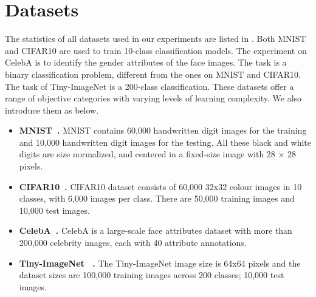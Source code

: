 \section{Datasets} \label{datasets_appendix}


The statistics of all datasets used in our experiments are listed in . Both MNIST and CIFAR10 are used to train 10-class classification models. The experiment on CelebA is to identify the gender attributes of the face images. The task is a binary classification problem, different from the ones on MNIST and CIFAR10. The task of Tiny-ImageNet is a 200-class classification. These datasets offer a range of objective categories with varying levels of learning complexity. We also introduce them as below.



\begin{itemize}[itemsep=0pt, parsep=0pt, leftmargin=*]
	\item \textbf{MNIST~\citep{deng2012mnist}.} MNIST contains 60,000 handwritten digit images for the training and 10,000 handwritten digit images for the testing. All these black and white digits are size normalized, and centered in a fixed-size image with 28 × 28 pixels.
	\item \textbf{CIFAR10~\citep{krizhevsky2009learning}.} CIFAR10 dataset consists of 60,000 32x32 colour images in 10 classes, with 6,000 images per class. There are 50,000 training images and 10,000 test images.
	\item  \textbf{CelebA~\citep{liu2018large}.} CelebA is a large-scale face attributes dataset with more than 200,000 celebrity images, each with 40 attribute annotations.
	\item \textbf{Tiny-ImageNet~\citep{le2015tiny} .} The Tiny-ImageNet image size is 64x64 pixels and the dataset sizes are 100,000 training images across 200 classes; 10,000 test images.
\end{itemize}

